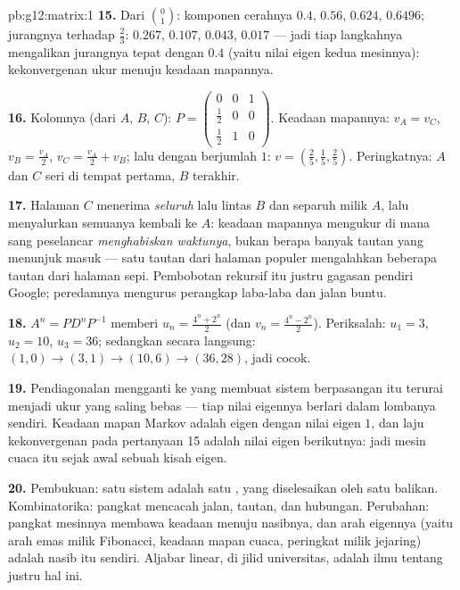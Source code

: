 \begin{solution}{pb:g12:matrix:1}
\textbf{15.} Dari $\binom01$: komponen cerahnya $0.4$, $0.56$,
$0.624$, $0.6496$; jurangnya terhadap $\frac23$: $0.267$, $0.107$,
$0.043$, $0.017$ --- jadi tiap langkahnya mengalikan jurangnya tepat dengan
$0.4$ (yaitu nilai eigen kedua mesinnya): kekonvergenan
ukur menuju keadaan mapannya.

\textbf{16.} Kolomnya (dari $A$, $B$, $C$):
$P = \begin{pmatrix} 0 & 0 & 1\\ \frac12 & 0 & 0\\
\frac12 & 1 & 0\end{pmatrix}$. Keadaan mapannya: $v_A = v_C$,
$v_B = \frac{v_A}{2}$, $v_C = \frac{v_A}{2} + v_B$; lalu dengan berjumlah
$1$: $v = \left(\frac25, \frac15, \frac25\right)$. Peringkatnya:
$A$ dan $C$ seri di tempat pertama, $B$ terakhir.

\textbf{17.} Halaman $C$ menerima \emph{seluruh} lalu lintas $B$ dan separuh
milik $A$, lalu menyalurkan semuanya kembali ke $A$: keadaan
mapannya mengukur di mana sang peselancar \emph{menghabiskan waktunya}, bukan
berapa banyak tautan yang menunjuk masuk --- satu tautan dari halaman populer
mengalahkan beberapa tautan dari halaman sepi. Pembobotan rekursif itu
justru gagasan pendiri Google; peredamnya mengurus perangkap laba-laba
dan jalan buntu.

\textbf{18.} $A^n = P D^n P^{-1}$ memberi
$u_n = \frac{4^n + 2^n}{2}$ (dan
$v_n = \frac{4^n - 2^n}{2}$). Periksalah: $u_1 = 3$, $u_2 = 10$,
$u_3 = 36$; sedangkan secara langsung: $(1,0) \to (3,1) \to (10,6) \to
(36, 28)$, jadi cocok.

\textbf{19.} Pendiagonalan mengganti ke  yang membuat
sistem berpasangan itu terurai menjadi  ukur yang saling
bebas --- tiap nilai eigennya berlari dalam lombanya sendiri. Keadaan
mapan Markov adalah  eigen dengan nilai eigen $1$, dan
laju kekonvergenan pada pertanyaan 15 adalah nilai eigen berikutnya: jadi
mesin cuaca itu sejak awal sebuah kisah eigen.

\textbf{20.} Pembukuan: satu sistem adalah satu  ,
yang diselesaikan oleh satu balikan. Kombinatorika: pangkat  mencacah jalan, tautan, dan hubungan. Perubahan: pangkat
mesinnya membawa keadaan menuju nasibnya, dan
arah eigennya (yaitu arah emas milik Fibonacci, keadaan mapan cuaca,
 peringkat milik jejaring) adalah nasib itu sendiri.
Aljabar linear, di jilid universitas, adalah ilmu tentang
justru hal ini.

\end{solution}

